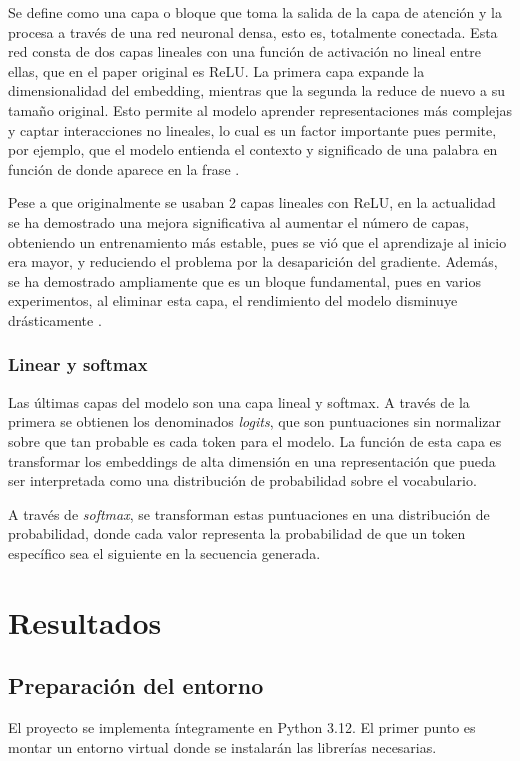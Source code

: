 \documentclass[11pt]{book}
\newcommand{\clearemptydoublepage}{\newpage{\pagestyle{empty}\cleardoublepage}}
\theoremstyle{plain}
\theoremstyle{definition}
\begin{document}
Se define como una capa o bloque que toma la salida de la capa de atención y la procesa a través de una red neuronal densa, esto es, totalmente conectada. Esta red consta de dos capas lineales con una función de activación no lineal entre ellas, que en el paper original es ReLU. La primera capa expande la dimensionalidad del embedding, mientras que la segunda la reduce de nuevo a su tamaño original. Esto permite al modelo aprender representaciones más complejas y captar interacciones no lineales, lo cual es un factor importante pues permite, por ejemplo, que el modelo entienda el contexto y significado de una palabra en función de donde aparece en la frase \parencite{kyeg_feedforward_demystified}.

Pese a que originalmente se usaban 2 capas lineales con ReLU, en la actualidad se ha demostrado una mejora significativa al aumentar el número de capas, obteniendo un entrenamiento más estable, pues se vió que el aprendizaje al inicio era mayor, y reduciendo el problema por la desaparición del gradiente. Además, se ha demostrado ampliamente que es un bloque fundamental, pues en varios experimentos, al eliminar esta capa, el rendimiento del modelo disminuye drásticamente \parencite{gerber2025ffn}.


\subsection{Linear y softmax}
Las últimas capas del modelo son una capa lineal y softmax. A través de la primera se obtienen los denominados \textit{logits}, que son puntuaciones sin normalizar sobre que tan probable es cada token para el modelo. La función de esta capa es transformar los embeddings de alta dimensión en una representación que pueda ser interpretada como una distribución de probabilidad sobre el vocabulario.

A través de \textit{softmax}, se transforman estas puntuaciones en una distribución de probabilidad, donde cada valor representa la probabilidad de que un token específico sea el siguiente en la secuencia generada. 


\clearemptydoublepage

\chapter{Resultados}
\section{Preparación del entorno}
El proyecto se implementa íntegramente en Python 3.12. 
El primer punto es montar un entorno virtual donde se instalarán las librerías necesarias.
\end{document}
